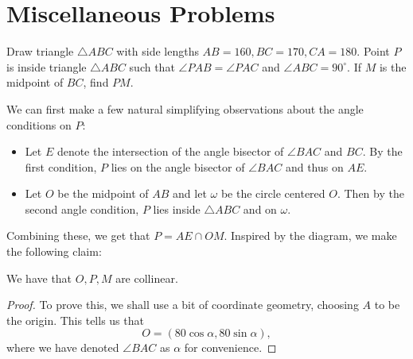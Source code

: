 \documentclass[a4paper, 12pt]{article}
\begin{document}
\section*{Miscellaneous Problems}

\begin{chirpbox}
    \begin{problem}
        Draw triangle \( \triangle ABC \) with side lengths \( AB = 160, BC = 170, CA = 180 \). Point \( P \) is inside triangle \( \triangle ABC \) such that \( \angle PAB = \angle PAC \) and \( \angle ABC = 90^\circ \). If \( M \) is the midpoint of \( BC \), find \( PM \).
    \end{problem}
\end{chirpbox}

\begin{solution}
    We can first make a few natural simplifying observations about the angle conditions on \( P \):
    \begin{itemize}
        \item Let \( E \) denote the intersection of the angle bisector of \( \angle BAC \) and \( BC \). By the first condition, \( P \) lies on the angle bisector of \( \angle BAC \) and thus on \( AE \).
        \item Let \( O \) be the midpoint of \( AB \) and let \( \omega \) be the circle centered \( O \). Then by the second angle condition, \( P \) lies inside \( \triangle ABC \) and on \( \omega \).
    \end{itemize}

    Combining these, we get that \( P = AE \cap OM \). Inspired by the diagram, we make the following claim:
    \begin{claim}
        We have that \( O, P, M \) are collinear.
    \end{claim}
    \begin{proof}
        To prove this, we shall use a bit of coordinate geometry, choosing \( A \) to be the origin. This tells us that
        \[
            O = (80 \cos\alpha, 80 \sin\alpha )
        ,\]
        where we have denoted \( \angle BAC \) as \( \alpha \) for convenience.


\end{proof}
\end{solution}
\end{document}
